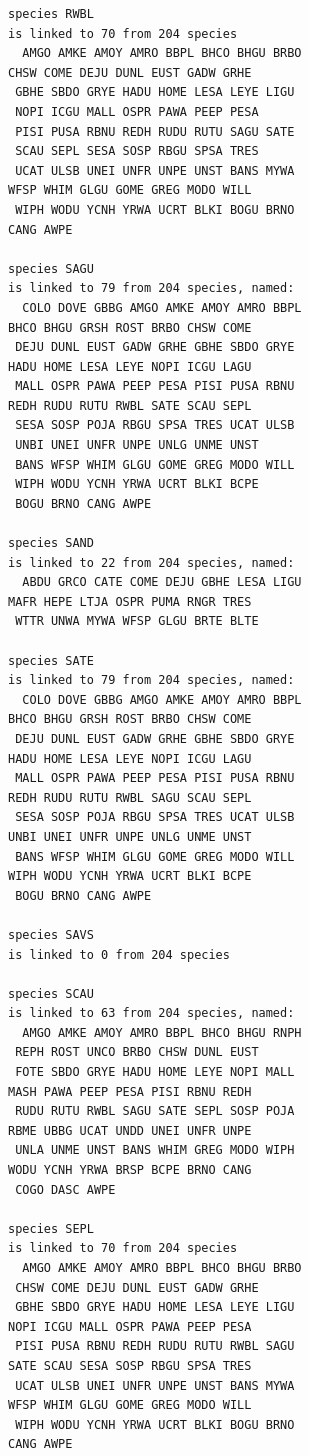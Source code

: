 \documentclass{statsoc}
\begin{document}
\begin{lstlisting}
species RWBL
is linked to 70 from 204 species
  AMGO AMKE AMOY AMRO BBPL BHCO BHGU BRBO 
CHSW COME DEJU DUNL EUST GADW GRHE
 GBHE SBDO GRYE HADU HOME LESA LEYE LIGU
 NOPI ICGU MALL OSPR PAWA PEEP PESA
 PISI PUSA RBNU REDH RUDU RUTU SAGU SATE
 SCAU SEPL SESA SOSP RBGU SPSA TRES
 UCAT ULSB UNEI UNFR UNPE UNST BANS MYWA 
WFSP WHIM GLGU GOME GREG MODO WILL
 WIPH WODU YCNH YRWA UCRT BLKI BOGU BRNO 
CANG AWPE

species SAGU
is linked to 79 from 204 species, named:
  COLO DOVE GBBG AMGO AMKE AMOY AMRO BBPL 
BHCO BHGU GRSH ROST BRBO CHSW COME
 DEJU DUNL EUST GADW GRHE GBHE SBDO GRYE 
HADU HOME LESA LEYE NOPI ICGU LAGU
 MALL OSPR PAWA PEEP PESA PISI PUSA RBNU 
REDH RUDU RUTU RWBL SATE SCAU SEPL
 SESA SOSP POJA RBGU SPSA TRES UCAT ULSB
 UNBI UNEI UNFR UNPE UNLG UNME UNST
 BANS WFSP WHIM GLGU GOME GREG MODO WILL
 WIPH WODU YCNH YRWA UCRT BLKI BCPE
 BOGU BRNO CANG AWPE

species SAND
is linked to 22 from 204 species, named:
  ABDU GRCO CATE COME DEJU GBHE LESA LIGU 
MAFR HEPE LTJA OSPR PUMA RNGR TRES
 WTTR UNWA MYWA WFSP GLGU BRTE BLTE

species SATE
is linked to 79 from 204 species, named:
  COLO DOVE GBBG AMGO AMKE AMOY AMRO BBPL 
BHCO BHGU GRSH ROST BRBO CHSW COME
 DEJU DUNL EUST GADW GRHE GBHE SBDO GRYE 
HADU HOME LESA LEYE NOPI ICGU LAGU
 MALL OSPR PAWA PEEP PESA PISI PUSA RBNU 
REDH RUDU RUTU RWBL SAGU SCAU SEPL
 SESA SOSP POJA RBGU SPSA TRES UCAT ULSB 
UNBI UNEI UNFR UNPE UNLG UNME UNST
 BANS WFSP WHIM GLGU GOME GREG MODO WILL 
WIPH WODU YCNH YRWA UCRT BLKI BCPE
 BOGU BRNO CANG AWPE

species SAVS
is linked to 0 from 204 species

species SCAU
is linked to 63 from 204 species, named:
  AMGO AMKE AMOY AMRO BBPL BHCO BHGU RNPH
 REPH ROST UNCO BRBO CHSW DUNL EUST
 FOTE SBDO GRYE HADU HOME LEYE NOPI MALL 
MASH PAWA PEEP PESA PISI RBNU REDH
 RUDU RUTU RWBL SAGU SATE SEPL SOSP POJA 
RBME UBBG UCAT UNDD UNEI UNFR UNPE
 UNLA UNME UNST BANS WHIM GREG MODO WIPH 
WODU YCNH YRWA BRSP BCPE BRNO CANG
 COGO DASC AWPE

species SEPL
is linked to 70 from 204 species
  AMGO AMKE AMOY AMRO BBPL BHCO BHGU BRBO
 CHSW COME DEJU DUNL EUST GADW GRHE
 GBHE SBDO GRYE HADU HOME LESA LEYE LIGU 
NOPI ICGU MALL OSPR PAWA PEEP PESA
 PISI PUSA RBNU REDH RUDU RUTU RWBL SAGU 
SATE SCAU SESA SOSP RBGU SPSA TRES
 UCAT ULSB UNEI UNFR UNPE UNST BANS MYWA 
WFSP WHIM GLGU GOME GREG MODO WILL
 WIPH WODU YCNH YRWA UCRT BLKI BOGU BRNO 
CANG AWPE


\end{lstlisting}
\end{document}
